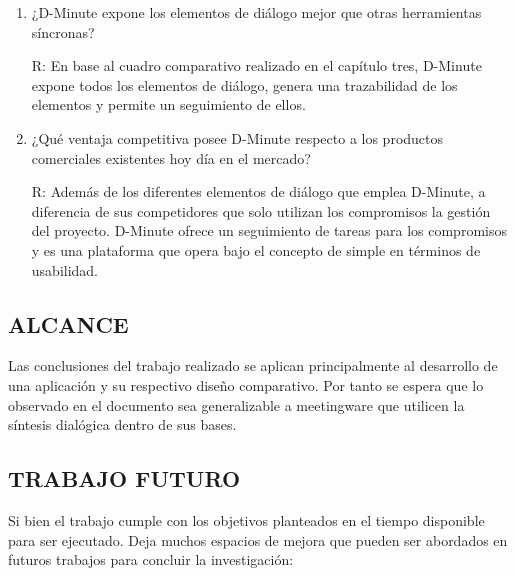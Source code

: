 \begin{enumerate}[1.]
	\item ¿D-Minute expone los elementos de diálogo mejor que otras herramientas síncronas?

R: En base al cuadro comparativo realizado en el capítulo tres, D-Minute expone todos los elementos de diálogo, genera una trazabilidad de los elementos y permite un seguimiento de ellos.

	\item ¿Qué ventaja competitiva posee D-Minute respecto a los productos comerciales existentes hoy día en el mercado?

R: Además de los diferentes elementos de diálogo que emplea D-Minute, a diferencia de sus competidores que solo utilizan los compromisos la gestión del proyecto. D-Minute ofrece un seguimiento de tareas para los compromisos y es una plataforma que opera bajo el concepto de simple en términos de usabilidad.

\end{enumerate}

\subsection{ALCANCE}

Las conclusiones del trabajo realizado se aplican principalmente al desarrollo de una aplicación y su respectivo diseño comparativo. Por tanto se espera que lo observado en el documento sea generalizable a meetingware que utilicen la síntesis dialógica dentro de sus bases. 

\subsection{TRABAJO FUTURO}

Si bien el trabajo cumple con los objetivos planteados en el tiempo disponible para ser ejecutado. Deja muchos espacios de mejora que pueden ser abordados en futuros trabajos para concluir la investigación:

